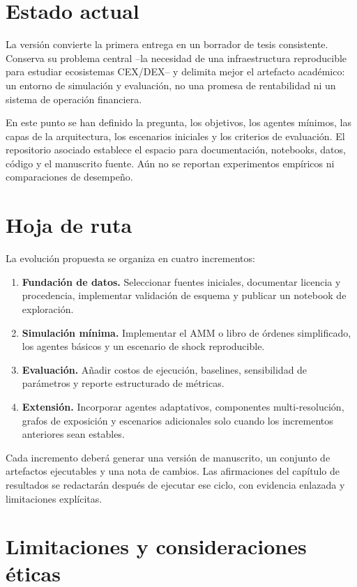\section{Estado actual}

La versión \versionTesis{} convierte la primera entrega en un borrador de tesis consistente. Conserva su problema central --la necesidad de una infraestructura reproducible para estudiar ecosistemas CEX/DEX-- y delimita mejor el artefacto académico: un entorno de simulación y evaluación, no una promesa de rentabilidad ni un sistema de operación financiera.

En este punto se han definido la pregunta, los objetivos, los agentes mínimos, las capas de la arquitectura, los escenarios iniciales y los criterios de evaluación. El repositorio asociado establece el espacio para documentación, notebooks, datos, código y el manuscrito fuente. Aún no se reportan experimentos empíricos ni comparaciones de desempeño.

\section{Hoja de ruta}

La evolución propuesta se organiza en cuatro incrementos:

\begin{enumerate}
  \item \textbf{Fundación de datos.} Seleccionar fuentes iniciales, documentar licencia y procedencia, implementar validación de esquema y publicar un notebook de exploración.
  \item \textbf{Simulación mínima.} Implementar el AMM o libro de órdenes simplificado, los agentes básicos y un escenario de shock reproducible.
  \item \textbf{Evaluación.} Añadir costos de ejecución, baselines, sensibilidad de parámetros y reporte estructurado de métricas.
  \item \textbf{Extensión.} Incorporar agentes adaptativos, componentes multi-resolución, grafos de exposición y escenarios adicionales solo cuando los incrementos anteriores sean estables.
\end{enumerate}

Cada incremento deberá generar una versión de manuscrito, un conjunto de artefactos ejecutables y una nota de cambios. Las afirmaciones del capítulo de resultados se redactarán después de ejecutar ese ciclo, con evidencia enlazada y limitaciones explícitas.

\section{Limitaciones y consideraciones éticas}

